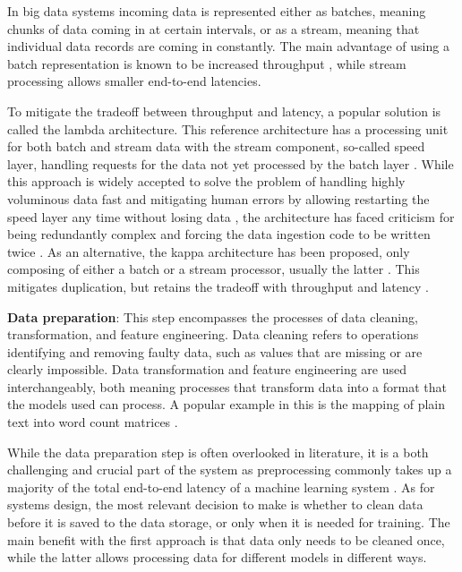 In big data systems incoming data is represented either as batches, meaning chunks of data coming in at certain intervals, or as a stream, meaning that individual data records are coming in constantly. The main advantage of using a batch representation is known to be increased throughput%
, while stream processing allows smaller end-to-end latencies. %

To mitigate the tradeoff between throughput and latency, a popular solution is called the lambda architecture. This reference architecture has a processing unit for both batch and stream data with the stream component, so-called speed layer, handling requests for the data not yet processed by the batch layer \cite{beatingcap}. While this approach is widely accepted to solve the problem of handling highly voluminous data fast and mitigating human errors by allowing restarting the speed layer any time without losing data \cite{lambdakappa}, the architecture has faced criticism for being redundantly complex and forcing the data ingestion code to be written twice \cite{questioninglambda} \cite{uber} \cite{facebook}. As an alternative, the kappa architecture has been proposed, only composing of either a batch or a stream processor, usually the latter \cite{questioninglambda}. This mitigates duplication, but retains the tradeoff with throughput and latency \cite{lambdakappa}.

\textbf{Data preparation}: This step encompasses the processes of data cleaning, transformation, and feature engineering. Data cleaning refers to operations identifying and removing faulty data, such as values that are missing or are clearly impossible. Data transformation and feature engineering are used interchangeably, both meaning processes that transform data into a format that the models used can process. A popular example in this is the mapping of plain text into word count matrices \cite{dapbook}.

While the data preparation step is often overlooked in literature,
it is a both challenging and crucial part of the system as preprocessing commonly takes up a majority of the total end-to-end latency of a machine learning system \cite{adaptivelearningsystems}. As for systems design, the most relevant decision to make is whether to clean data before it is saved to the data storage, or only when it is  needed for training. The main benefit with the first approach is that data only needs to be cleaned once, while the latter allows processing data for different models in different ways.

